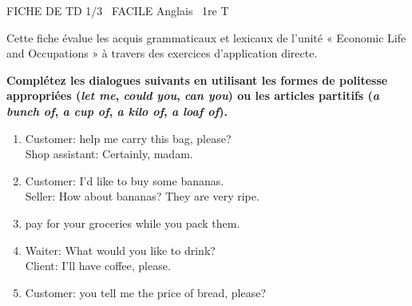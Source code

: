 \documentclass[11pt]{article}
\begin{document}
\begin{tcolorbox}[enhanced,colback=popink,colframe=popink,arc=10pt,boxrule=0pt,left=12pt,right=12pt,top=9pt,bottom=9pt]
{\color{white}\popxbold\small FICHE DE TD 1/3 \textbullet\ FACILE \hfill Anglais \textbullet\ 1re T\par}
\end{tcolorbox}
\vspace{4pt}
Cette fiche évalue les acquis grammaticaux et lexicaux de l'unité « Economic Life and Occupations » à travers des exercices d'application directe.

\begin{exercice}
\textbf{Complétez les dialogues suivants en utilisant les formes de politesse appropriées (\textit{let me}, \textit{could you}, \textit{can you}) ou les articles partitifs (\textit{a bunch of}, \textit{a cup of}, \textit{a kilo of}, \textit{a loaf of}).}
\begin{enumerate}
    \item Customer: \underline{\hspace{4cm}} help me carry this bag, please?\\
    Shop assistant: Certainly, madam.
    \item Customer: I'd like to buy some bananas.\\
    Seller: How about \underline{\hspace{3cm}} bananas? They are very ripe.
    \item \underline{\hspace{3cm}} pay for your groceries while you pack them.
    \item Waiter: What would you like to drink?\\
    Client: I'll have \underline{\hspace{3cm}} coffee, please.
    \item Customer: \underline{\hspace{3cm}} you tell me the price of \underline{\hspace{2cm}} bread, please?
\end{enumerate}
\end{exercice}
\end{document}
